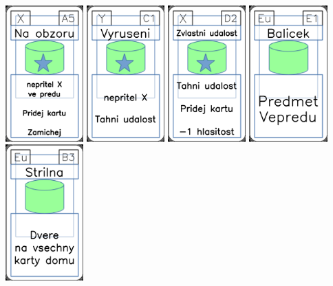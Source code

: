 \documentclass[a4paper]{article}
\begin{document}
	\includegraphics[width=3.0cm]{img-5_4}
	\includegraphics[width=3.0cm]{img-5_40}
	\includegraphics[width=3.0cm]{img-5_16}
	\includegraphics[width=3.0cm]{img-4_20}
	\includegraphics[width=3.0cm]{img-4_37}
\end{document}
